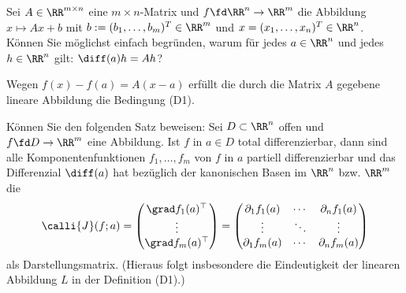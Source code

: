 \begin{frage}
  Sei $A \in \RR^{m\times n}$ eine $m\times n$-Matrix und 
  $f \fd \RR^n \to \RR^m$ die Abbildung $x\mapsto Ax+b$ mit 
  $b:=(b_1,\ldots, b_m)^T \in \RR^m$ und $x=(x_1,\ldots,x_n)^T \in \RR^n$. 
  Können Sie möglichst einfach begründen, warum für jedes $a\in \RR^n$ und 
  jedes $h\in \RR^n$ gilt: $\diff (a)h=Ah$?
\end{frage}


\begin{antwort}
  Wegen $f(x)-f(a)=A(x-a)$ erfüllt die durch die Matrix $A$ gegebene lineare 
  Abbildung die Bedingung (D1).
  \AntEnd
\end{antwort}


\begin{frage}\label{10_jacobi}
  Können Sie den folgenden Satz beweisen: Sei $D\subset \RR^n$ offen und 
  $f\fd D\to \RR^m$ eine Abbildung. Ist $f$ in $a\in D$ total differenzierbar, 
  dann sind alle Komponentenfunktionen $f_1,\ldots,f_m$ von $f$ in 
  $a$ partiell differenzierbar und das Differenzial $\diff (a)$ hat bezüglich 
  der kanonischen Basen im $\RR^n$ bzw. $\RR^m$ die  
  \[
  \calli{J}(f;a) = 
  \begin{pmatrix} \grad f_1(a)^\top \\ \vdots \\ \grad f_m (a)^\top \end{pmatrix}
  = 
  \begin{pmatrix} \partial_1 f_1(a) & \cdots & \partial_n f_1(a) \\
    \vdots & \ddots & \vdots \\
    \partial_1 f_m(a) & \cdots & \partial_n f_m(a)
  \end{pmatrix}
  \]
  als Darstellungsmatrix. (Hieraus folgt insbesondere die Eindeutigkeit 
  der linearen Abbildung $L$ in der Definition (D1).)
\end{frage}


